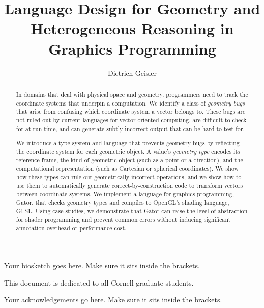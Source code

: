 \documentclass[phd,tocprelim]{cornell}
\title {Language Design for Geometry and Heterogeneous Reasoning in Graphics Programming}
\author {Dietrich Geisler}
\begin{document}
\maketitle
\makecopyright

\mathligson

\begin{abstract}
In domains that deal with physical space and geometry,
programmers need to track the coordinate systems that underpin a computation.
We identify a class of \emph{geometry bugs} that arise from confusing which coordinate system a vector belongs to.
These bugs are not ruled out by current languages for vector-oriented computing, are difficult to check for at run time, and can generate subtly incorrect output that can be hard to test for.

We introduce a type system and language that prevents geometry bugs by reflecting the coordinate system for each geometric object.
A value's \emph{geometry type} encodes its reference frame, the kind of geometric object (such as a point or a direction), and the computational representation (such as Cartesian or spherical coordinates).
We show how these types can rule out geometrically incorrect operations,
and we show how to use them to automatically generate correct-by-construction code to transform vectors between coordinate systems.
We implement a language for graphics programming, Gator, that checks geometry types and compiles to OpenGL's shading language, GLSL.
Using case studies, we demonstrate that Gator can raise the level of abstraction for shader programming and prevent common errors without inducing significant annotation overhead or performance cost.
\end{abstract}

\begin{biosketch}
Your biosketch goes here. Make sure it sits inside
the brackets.
\end{biosketch}

\begin{dedication}
This document is dedicated to all Cornell graduate students.
\end{dedication}

\begin{acknowledgements}
Your acknowledgements go here. Make sure it sits inside the brackets.
\end{acknowledgements}

\contentspage
\tablelistpage
\figurelistpage
\end{document}
